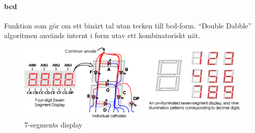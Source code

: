 \paragraph{bcd}\label{sec:bcd}
Funktion som gör om ett binärt tal utan tecken till bcd-form. ``Double Dabble'' algoritmen används internt i form utav ett kombinatoriskt nät.


\begin{figure}[htp]
\centering
\includegraphics[width=\textwidth]{segment.eps}
\caption{7-segments display}
\label{}
\end{figure}